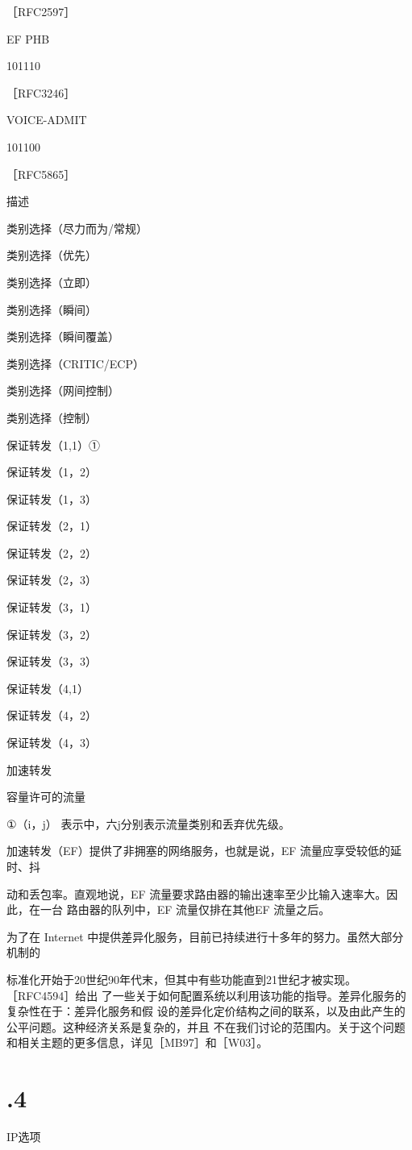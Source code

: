 ［RFC2597］

EF PHB

101110

［RFC3246］

VOICE-ADMIT

101100

［RFC5865］

描述

类别选择（尽力而为/常规）

类别选择（优先）

类别选择（立即）

类别选择（瞬间）

类别选择（瞬间覆盖）

类别选择（CRITIC/ECP）

类别选择（网间控制）

类别选择（控制）

保证转发（1,1）①

保证转发（1，2）

保证转发（1，3）

保证转发（2，1）

保证转发（2，2）

保证转发（2，3）

保证转发（3，1）

保证转发（3，2）

保证转发（3，3）

保证转发（4,1）

保证转发（4，2）

保证转发（4，3）

加速转发

容量许可的流量

①（i，j） 表示中，六j分别表示流量类别和丢弃优先级。

加速转发（EF）提供了非拥塞的网络服务，也就是说，EF 流量应享受较低的延时、抖

动和丢包率。直观地说，EF 流量要求路由器的输出速率至少比输入速率大。因此，在一台
路由器的队列中，EF 流量仅排在其他EF 流量之后。

为了在 Internet 中提供差异化服务，目前已持续进行十多年的努力。虽然大部分机制的

标准化开始于20世纪90年代末，但其中有些功能直到21世纪才被实现。［RFC4594］给出
了一些关于如何配置系统以利用该功能的指导。差异化服务的复杂性在于：差异化服务和假
设的差异化定价结构之间的联系，以及由此产生的公平问题。这种经济关系是复杂的，并且
不在我们讨论的范围内。关于这个问题和相关主题的更多信息，详见［MB97］和［W03］。

\section{.4}
IP选项

